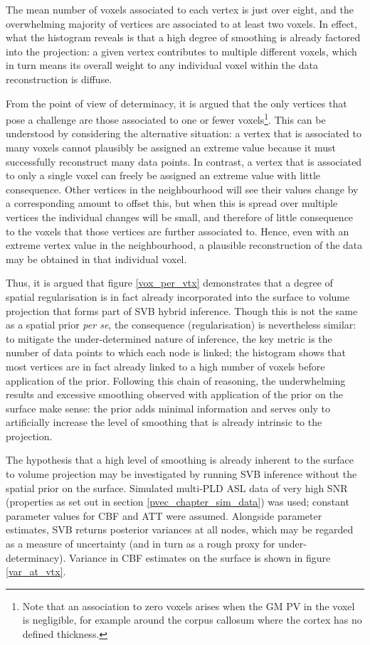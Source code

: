 The mean number of voxels associated to each vertex is just over eight, and the overwhelming majority of vertices are associated to at least two voxels. In effect, what the histogram reveals is that a high degree of smoothing is already factored into the projection: a given vertex contributes to multiple different voxels, which in turn means its overall weight to any individual voxel within the data reconstruction is diffuse. 

From the point of view of determinacy, it is argued that the only vertices that pose a challenge are those associated to one or fewer voxels\footnote{Note that an association to zero voxels arises when the GM PV in the voxel is negligible, for example around the corpus callosum where the cortex has no defined thickness.}. This can be understood by considering the alternative situation: a vertex that is associated to many voxels cannot plausibly be assigned an extreme value because it must successfully reconstruct many data points. In contrast, a vertex that is associated to only a single voxel can freely be assigned an extreme value with little consequence. Other vertices in the neighbourhood will see their values change by a corresponding amount to offset this, but when this is spread over multiple vertices the individual changes will be small, and therefore of little consequence to the voxels that those vertices are further associated to. Hence, even with an extreme vertex value in the neighbourhood, a plausible reconstruction of the data may be obtained in that individual voxel. 

Thus, it is argued that figure \ref{vox_per_vtx} demonstrates that a degree of spatial regularisation is in fact already incorporated into the surface to volume projection that forms part of SVB hybrid inference. Though this is not the same as a spatial prior \textit{per se}, the consequence (regularisation) is nevertheless similar: to mitigate the under-determined nature of inference, the key metric is the number of data points to which each node is linked; the histogram shows that most vertices are in fact already linked to a high number of voxels before application of the prior. Following this chain of reasoning, the underwhelming results and excessive smoothing observed with application of the prior on the surface make sense: the prior adds minimal information and serves only to artificially increase the level of smoothing that is already intrinsic to the projection. 

The hypothesis that a high level of smoothing is already inherent to the surface to volume projection may be investigated by running SVB inference without the spatial prior on the surface. Simulated multi-PLD ASL data of very high SNR (properties as set out in section \ref{pvec_chapter_sim_data}) was used; constant parameter values for CBF and ATT were assumed. Alongside parameter estimates, SVB returns posterior variances at all nodes, which may be regarded as a measure of uncertainty (and in turn as a rough proxy for under-determinacy). Variance in CBF estimates on the surface is shown in figure \ref{var_at_vtx}. 

